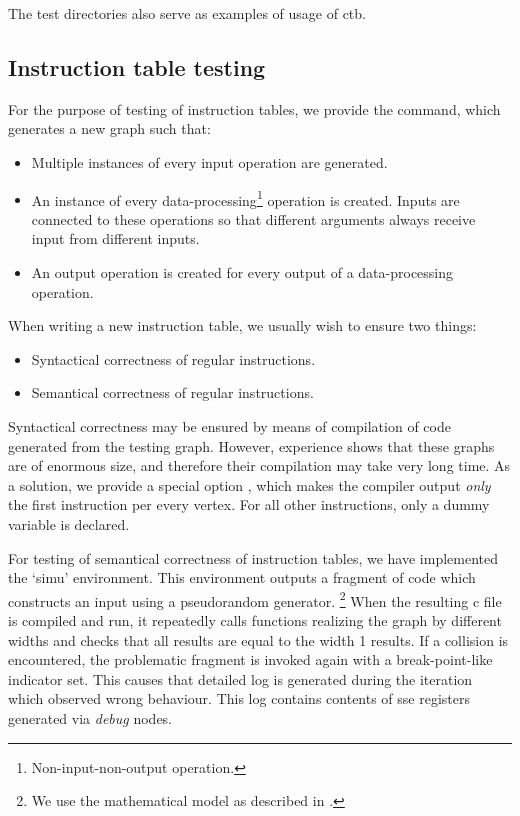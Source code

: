 The test directories also serve as examples of usage of ctb.

\subsection*{Instruction table testing}

For the purpose of testing of instruction tables, we provide the  command, which generates a new graph such that:
\begin{itemize}
  \item Multiple instances of every input operation are generated.
  \item An instance of every data-processing\footnote{Non-input-non-output operation.} operation is created. Inputs are connected to these operations so that different arguments always receive input from different inputs.
  \item An output operation is created for every output of a data-processing operation.
\end{itemize}

When writing a new instruction table, we usually wish to ensure two things:
\begin{itemize}
  \item Syntactical correctness of regular instructions.
  \item Semantical correctness of regular instructions.
\end{itemize}

Syntactical correctness may be ensured by means of compilation of code generated from the testing graph. However, experience shows that these graphs are of enormous size, and therefore their compilation may take very long time. As a solution, we provide a special option , which makes the compiler output \emph{only} the first instruction per every vertex. For all other instructions, only a dummy variable is declared.

For testing of semantical correctness of instruction tables, we have implemented the `simu' environment. This environment outputs a fragment of code which constructs an input using a pseudorandom generator. \footnote{We use the mathematical model as described in \cite{generator}.} When the resulting c file is compiled and run, it repeatedly calls functions realizing the graph by different widths and checks that all results are equal to the width 1 results. If a collision is encountered, the problematic fragment is invoked again with a break-point-like indicator set. This causes that detailed log is generated during the iteration which observed wrong behaviour. This log contains contents of sse registers generated via \emph{debug} nodes.

